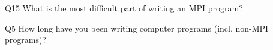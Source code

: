 \begin{description}%
\item{Q15} What is the most difficult part of writing an MPI program?%
\item{Q5} How long have you been writing computer programs (incl. non-MPI programs)?%
\end{description}%
